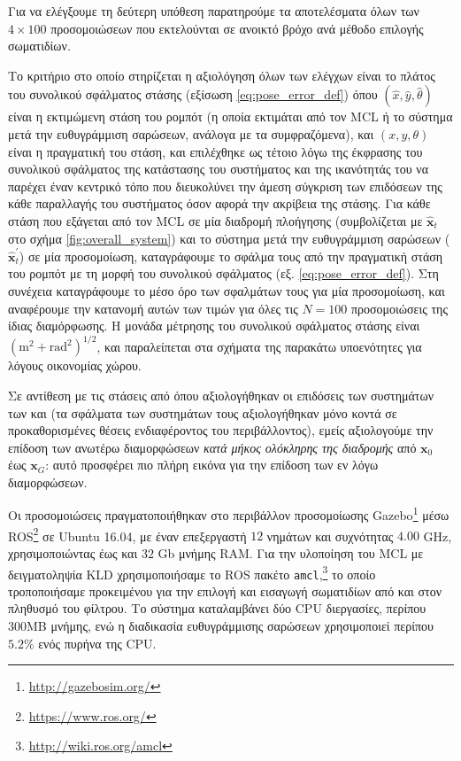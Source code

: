 Για να ελέγξουμε τη δεύτερη υπόθεση παρατηρούμε τα αποτελέσματα όλων των
$4\times100$ προσομοιώσεων που εκτελούνται σε ανοικτό βρόχο ανά μέθοδο
επιλογής σωματιδίων.

Το κριτήριο στο οποίο στηρίζεται η αξιολόγηση όλων των ελέγχων είναι το πλάτος
του συνολικού σφάλματος στάσης (εξίσωση \ref{eq:pose_error_def}) όπου
$(\hat{x}, \hat{y}, \hat{\theta})$ είναι η εκτιμώμενη στάση του ρομπότ (η οποία
εκτιμάται από τον MCL ή το σύστημα μετά την ευθυγράμμιση σαρώσεων, ανάλογα με
τα συμφραζόμενα), και $(x,y,\theta)$ είναι η πραγματική του στάση, και
επιλέχθηκε ως τέτοιο λόγω της έκφρασης του συνολικού σφάλματος της κατάστασης
του συστήματος και της ικανότητάς του να παρέχει έναν κεντρικό τόπο που
διευκολύνει την άμεση σύγκριση των επιδόσεων της κάθε παραλλαγής του συστήματος
όσον αφορά την ακρίβεια της στάσης. Για κάθε στάση που εξάγεται από τον MCL σε
μία διαδρομή πλοήγησης (συμβολίζεται με $\hat{\bm{x}}_t$ στο σχήμα
\ref{fig:overall_system}) και το σύστημα μετά την ευθυγράμμιση σαρώσεων
($\hat{\bm{x}}^{\prime}_t$) σε μία προσομοίωση, καταγράφουμε το σφάλμα τους από
την πραγματική στάση του ρομπότ με τη μορφή του συνολικού σφάλματος (εξ.
\ref{eq:pose_error_def}). Στη συνέχεια καταγράφουμε το μέσο όρο των
σφαλμάτων τους για μία προσομοίωση, και αναφέρουμε την κατανομή αυτών των τιμών
για όλες τις $N = 100$ προσομοιώσεις της ίδιας διαμόρφωσης. Η μονάδα μέτρησης
του συνολικού σφάλματος στάσης είναι $(\text{m}^2+\text{rad}^2)^{1/2}$, και
παραλείπεται στα σχήματα της παρακάτω υποενότητες για λόγους οικονομίας χώρου.

Σε αντίθεση με τις στάσεις από όπου αξιολογήθηκαν οι επιδόσεις των συστημάτων
των \cite{Rowekamper2012a} και \cite{Vasiljevic2016a}(τα σφάλματα των
συστημάτων τους αξιολογήθηκαν μόνο κοντά σε προκαθορισμένες θέσεις
ενδιαφέροντος του περιβάλλοντος), εμείς αξιολογούμε την επίδοση των ανωτέρω
διαμορφώσεων \textit{κατά μήκος ολόκληρης της διαδρομής} από $\bm{x}_0$ έως
$\bm{x}_G$: αυτό προσφέρει πιο πλήρη εικόνα για την επίδοση των εν λόγω
διαμορφώσεων.

Οι προσομοιώσεις πραγματοποιήθηκαν στο περιβάλλον προσομοίωσης
Gazebo\footnote{\url{http://gazebosim.org/}} μέσω
ROS\footnote{\url{https://www.ros.org/}} σε Ubuntu 16.04, με έναν επεξεργαστή
$12$ νημάτων και συχνότητας $4.00$ GHz, χρησιμοποιώντας έως και $32$ Gb μνήμης
RAM. Για την υλοποίηση του MCL με δειγματοληψία KLD χρησιμοποιήσαμε το ROS
πακέτο \texttt{amcl},\footnote{\url{http://wiki.ros.org/amcl}} το οποίο
τροποποιήσαμε προκειμένου για την επιλογή και εισαγωγή σωματιδίων από και στον
πληθυσμό του φίλτρου. Το σύστημα καταλαμβάνει δύο CPU διεργασίες, περίπου 300MB
μνήμης, ενώ η διαδικασία ευθυγράμμισης σαρώσεων χρησιμοποιεί περίπου $5.2\%$
ενός πυρήνα της CPU.


